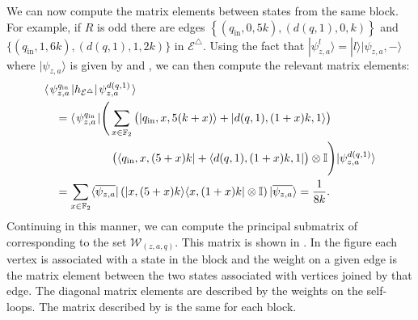 \documentclass[../thesis-main/thesis-main]{subfiles}
\begin{document}
We can now compute the matrix elements between states from the same block. For example, if $R$ is odd there are edges $\left\{ (q_{\text{in}},0,5k),(d(q,1),0,k)\right\}$ and $\{(q_{\text{in}},1,6k),(d(q,1),1,2k)\}$ in $\mathcal{E^{\triangle}}$. Using the fact that $|\psi_{z,a}^{l}\rangle=|l\rangle|\psi_{z,a},-\rangle$ where $|\psi_{z,a}\rangle$ is given by  and , we can then compute the relevant matrix elements:
\begin{align}
  &\langle\mspace{2mu} \psi_{z,a}^{q_{\text{in}}} \mspace{2mu} |h_{\mathcal{E}^{\triangle}}|\mspace{2mu} \psi_{z,a}^{d(q,1)} \mspace{2mu} \rangle\\ 
  &\quad=\langle\mspace{2mu} \psi_{z,a}^{q_{\text{in}}} \mspace{2mu} |\Bigg(\sum_{x\in\mathbb{F}_2}\big(|q_{\text{in}},x,5(k+x)\rangle+|d(q,1),(1+x)k,1\rangle\big)\nonumber\\
  &\qquad\qquad\qquad\big(\langle q_{\text{in}},x,(5+x)k|+\langle d(q,1),(1+x)k,1|\big)\otimes\mathbb{I}\Bigg)|\psi_{z,a}^{d(q,1)}\rangle\\
  &\quad=\sum_{x\in\mathbb{F}_2}\langle\overline{\psi_{z,a}}|\left(|x,(5+x)k\rangle\langle x,(1+x)k|\otimes\mathbb{I}\right)|\overline{\psi_{z,a}}\rangle
    =\frac{1}{8k}.
\end{align}
Continuing in this manner, we can compute the principal submatrix of  corresponding to the set $\mathcal{W}_{(z,a,q)}$. This matrix is shown in . In the figure each vertex is associated with a state in the block and the weight on a given edge is the matrix element between the two states associated with vertices joined by that edge. The diagonal matrix elements are described by the weights on the self-loops. The matrix described by  is the same for each block.

\begin{figure}
\centering
{}
\\
\caption{\label{fig:mat_els_for_a_block}}
\end{figure}
\end{document}
